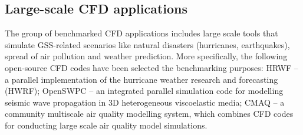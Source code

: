 
\subsection{Large-scale CFD applications}

The group of benchmarked CFD applications includes large scale tools that simulate GSS-related scenarios like natural disasters (hurricanes, earthquakes), spread of air pollution and weather prediction. More specifically, the following open-source CFD codes have been selected the benchmarking purposes: HRWF – a parallel implementation of the hurricane weather research and forecasting (HWRF); OpenSWPC – an integrated parallel simulation code for modelling seismic wave propagation in 3D heterogeneous viscoelastic media; CMAQ – a community multiscale air quality modelling system, which combines CFD codes for conducting large scale air quality model simulations.

